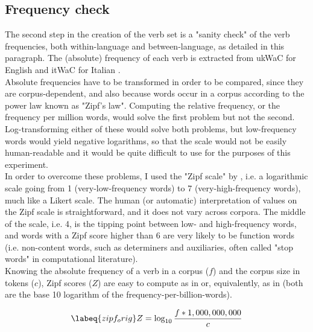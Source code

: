 \subsection{Frequency check} 
The second step in the creation of the verb set is a "sanity check" of the verb frequencies, both within-language and between-language, as detailed in this paragraph. The (absolute) frequency of each verb is extracted from ukWaC for English and itWaC for Italian \parencite{baroni2009wacky}.\\
Absolute frequencies have to be transformed in order to be compared, since they are corpus-dependent, and also because words occur in a corpus according to the power law known as "Zipf's law".
Computing the relative frequency, or the frequency per million words, would solve the first problem but not the second. Log-transforming either of these would solve both problems, but low-frequency words would yield negative logarithms, so that the scale would not be easily human-readable and it would be quite difficult to use for the purposes of this experiment.\\
In order to overcome these problems, I used the "Zipf scale" by \textcite{van2014subtlex}, i.e. a logarithmic scale going from 1 (very-low-frequency words) to 7 (very-high-frequency words), much like a Likert scale. The human (or automatic) interpretation of values on the Zipf scale is straightforward, and it does not vary across corpora. The middle of the scale, i.e. 4, is the tipping point between low- and high-frequency words, and words with a Zipf score higher than 6 are very likely to be function words (i.e. non-content words, such as determiners and auxiliaries, often called "stop words" in computational literature).\\
Knowing the absolute frequency of a verb in a corpus ($f$) and the corpus size in tokens ($c$), Zipf scores ($Z$) are easy to compute as in  or, equivalently, as in  (both are the base 10 logarithm of the frequency-per-billion-words).

\begin{equation} \labeq{zipf_orig}
Z = \log _{10} \frac{f*1,000,000,000}{c}
\end{equation}

